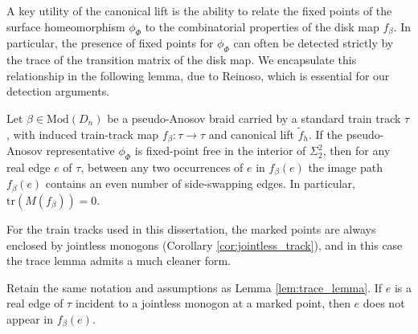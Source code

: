 
A key utility of the canonical lift is the ability to relate the fixed points of the surface homeomorphism $\phi_\Phi$ to the combinatorial properties of the disk map $f_\beta$. In particular, the presence of fixed points for $\phi_\Phi$ can often be detected strictly by the trace of the transition matrix of the disk map. We encapsulate this relationship in the following lemma, due to Reinoso, which is essential for our detection arguments.

\begin{lemma}
\label{lem:trace_lemma}
Let $\beta \in \mathrm{Mod}(D_n)$ be a pseudo-Anosov braid carried by a standard train track $\tau$, with induced train-track map $f_\beta: \tau \to \tau$ and canonical lift $\tilde{f}_h$. If the pseudo-Anosov representative $\phi_\Phi$ is fixed-point free in the interior of $\Sigma_2^2$, then for any real edge $e$ of $\tau$, between any two occurrences of $e$ in $f_\beta(e)$ the image path $f_\beta(e)$ contains an even number of side-swapping edges. In particular, $\mathrm{tr}(M(f_\beta)) = 0$.
\end{lemma}

For the train tracks used in this dissertation, the marked points are always enclosed by jointless monogons (Corollary \ref{cor:jointless_track}), and in this case the trace lemma admits a much cleaner form.

\begin{corollary}
\label{cor:trace_lemma_jointless}
Retain the same notation and assumptions as Lemma \ref{lem:trace_lemma}. If $e$ is a real edge of $\tau$ incident to a jointless monogon at a marked point, then $e$ does not appear in $f_\beta(e)$.
\end{corollary}

